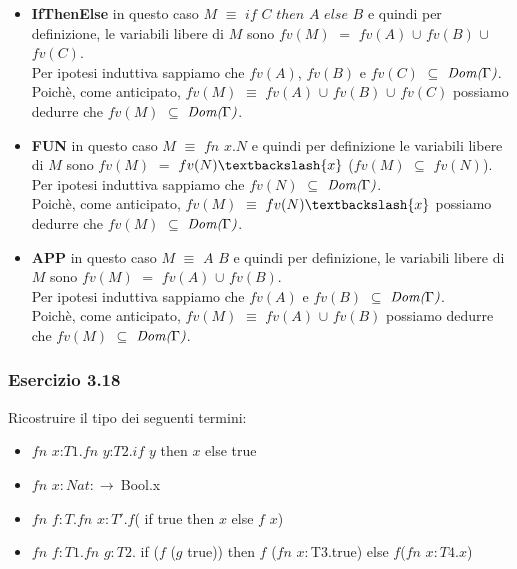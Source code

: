 \begin{itemize}
\begin{itemize}[label=$\star$]
		\item \textbf{IfThenElse} in questo caso $M$ $\equiv$ $if$ $C$ $then$ $A$ $else$ $B$ e quindi per definizione, le variabili libere di $M$ sono $fv(M)$ $=$ $fv(A)$ $\cup$ $fv(B)$ $\cup$ $fv(C)$.\\ Per ipotesi induttiva sappiamo che $fv(A)$, $fv(B)$ e $fv(C)$ $\subseteq$ $\emph{Dom(}\Gamma\emph{)}$.\\Poich\`e, come anticipato, $fv(M)$ $\equiv$ $fv(A)$ $\cup$ $fv(B)$ $\cup$ $fv(C)$ possiamo dedurre che $fv(M)$ $\subseteq$ $\emph{Dom(}\Gamma\emph{)}$.

		\item \textbf{FUN}  in questo caso $M$ $\equiv$ $fn$ $x.N$ e quindi per definizione le variabili libere di $M$ sono 
		$fv(M)$ $=$ $fv(N)\textbackslash \{x\}$ ($fv(M)$ $\subseteq$ $fv(N)$).\\ Per ipotesi induttiva sappiamo che $fv(N)$ $\subseteq$ $\emph{Dom(}\Gamma\emph{)}$.\\Poich\`e, come anticipato, $fv(M)$ $\equiv$ $fv(N)\textbackslash \{x\}$ possiamo dedurre che $fv(M)$ $\subseteq$ $\emph{Dom(}\Gamma\emph{)}$. 
		
		\item \textbf{APP} in questo caso $M$ $\equiv$ $A$ $B$ e quindi per definizione, le variabili libere di $M$ sono $fv(M)$ $=$ $fv(A)$ $\cup$ $fv(B)$.\\ Per ipotesi induttiva sappiamo che $fv(A)$ e $fv(B)$ $\subseteq$ $\emph{Dom(}\Gamma\emph{)}$.\\Poich\`e, come anticipato, $fv(M)$ $\equiv$ $fv(A)$ $\cup$ $fv(B)$ possiamo dedurre che $fv(M)$ $\subseteq$ $\emph{Dom(}\Gamma\emph{)}$. 
  
		\end{itemize}

\end{itemize}

\subsubsection*{Esercizio 3.18}
Ricostruire il tipo dei seguenti termini:
\begin{itemize}
\item $fn$ $x$:$T1.fn$ $y$:$T2.if$ $y$ then $x$ else true
\item $fn$ $x:Nat:\rightarrow\:$Bool.x
\item $fn$ $f:T.fn$ $x:T'.f$( if true  then  $x$  else  $f$ $x$)
\item $fn$ $f:T1.fn$ $g:T2.$ if ($f$ ($g$ true)) then $f$ ($fn$ $x:$T3.true) else $f$($fn$ $x:T4.x$)
\end{itemize}

